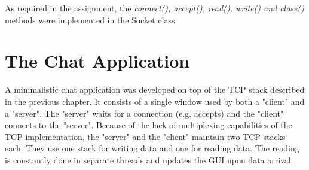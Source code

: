 \documentclass{article}
\begin{document}
As required in the assignment, the \textit{connect(), accept(), read(), write() and close()} methods were implemented
in the Socket class.



\section{The Chat Application}
A minimalistic chat application was developed on top of the TCP stack described in the previous chapter.
It consists of a single window used by both a "client" and a "server". The "server" waits for a connection
(e.g. accepts) and the "client" connects to the "server". Because of the lack of multiplexing capabilities
of the TCP implementation, the "server" and the "client" maintain two TCP stacks each. They use one stack
for writing data and one for reading data. The reading is constantly done in separate threads and updates
the GUI upon data arrival.
\end{document}
